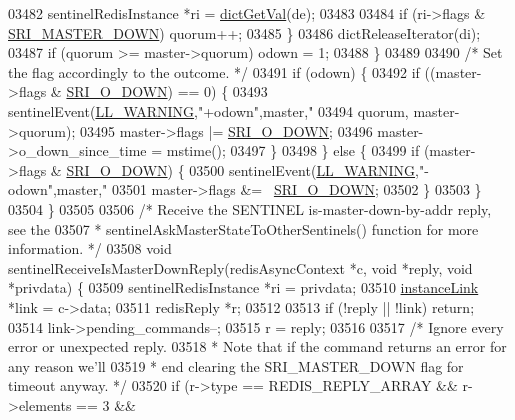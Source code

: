 \begin{DoxyCode}
{{{{{{{{{{{{{{{{{{{{{{{{{{{{{{{{{{{{{{{{{{{{{{{{{{{{{{{{{{{{{{{{{{{{{{{{{{{{03482             sentinelRedisInstance *ri = \hyperlink{dict_8h_ae8d2cc391873b2bea2b87c4f80f43120}{dictGetVal}(de);
03483 
03484             \textcolor{keywordflow}{if} (ri->flags & \hyperlink{sentinel_8c_a80003592a6337bdc484182ff1d33e41c}{SRI\_MASTER\_DOWN}) quorum++;
03485         \}
03486         dictReleaseIterator(di);
03487         \textcolor{keywordflow}{if} (quorum >= master->quorum) odown = 1;
03488     \}
03489 
03490     \textcolor{comment}{/* Set the flag accordingly to the outcome. */}
03491     \textcolor{keywordflow}{if} (odown) \{
03492         \textcolor{keywordflow}{if} ((master->flags & \hyperlink{sentinel_8c_a3bbbca05543cd9d9f86d276e2c7c719c}{SRI\_O\_DOWN}) == 0) \{
03493             sentinelEvent(\hyperlink{server_8h_a31229b9334bba7d6be2a72970967a14b}{LL\_WARNING},\textcolor{stringliteral}{"+odown"},master,\textcolor{stringliteral}{"%
03494                 quorum, master->quorum);
03495             master->flags |= \hyperlink{sentinel_8c_a3bbbca05543cd9d9f86d276e2c7c719c}{SRI\_O\_DOWN};
03496             master->o\_down\_since\_time = mstime();
03497         \}
03498     \} \textcolor{keywordflow}{else} \{
03499         \textcolor{keywordflow}{if} (master->flags & \hyperlink{sentinel_8c_a3bbbca05543cd9d9f86d276e2c7c719c}{SRI\_O\_DOWN}) \{
03500             sentinelEvent(\hyperlink{server_8h_a31229b9334bba7d6be2a72970967a14b}{LL\_WARNING},\textcolor{stringliteral}{"-odown"},master,\textcolor{stringliteral}{"%
03501             master->flags &= ~\hyperlink{sentinel_8c_a3bbbca05543cd9d9f86d276e2c7c719c}{SRI\_O\_DOWN};
03502         \}
03503     \}
03504 \}
03505 
03506 \textcolor{comment}{/* Receive the SENTINEL is-master-down-by-addr reply, see the}
03507 \textcolor{comment}{ * sentinelAskMasterStateToOtherSentinels() function for more information. */}
03508 \textcolor{keywordtype}{void} sentinelReceiveIsMasterDownReply(redisAsyncContext *c, \textcolor{keywordtype}{void} *reply, \textcolor{keywordtype}{void} *privdata) \{
03509     sentinelRedisInstance *ri = privdata;
03510     \hyperlink{structinstanceLink}{instanceLink} *link = c->data;
03511     redisReply *r;
03512 
03513     \textcolor{keywordflow}{if} (!reply || !link) \textcolor{keywordflow}{return};
03514     link->pending\_commands--;
03515     r = reply;
03516 
03517     \textcolor{comment}{/* Ignore every error or unexpected reply.}
03518 \textcolor{comment}{     * Note that if the command returns an error for any reason we'll}
03519 \textcolor{comment}{     * end clearing the SRI\_MASTER\_DOWN flag for timeout anyway. */}
03520     \textcolor{keywordflow}{if} (r->type == REDIS\_REPLY\_ARRAY && r->elements == 3 &&
}}}}}}}}}}}}}}}}}}}}}}}}}}}}}}}}}}}}}}}}}}}}}}}}}}}}}}}}}}}}}}}}}}}}}}}}}}}}}}
\end{DoxyCode}

